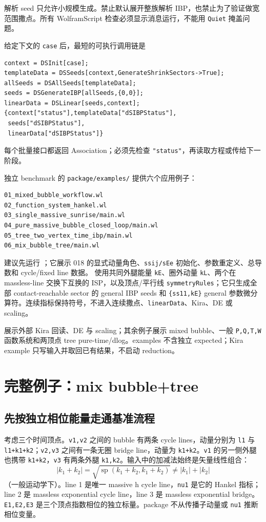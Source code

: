 ﻿\documentclass[a4paper,11pt]{article}
\begin{document}
\begin{proofbox}
解析 seed 只允许小规模生成。禁止默认展开整族解析 IBP，也禁止为了验证做宽范围撒点。所有 WolframScript 检查必须显示消息运行，不能用 \texttt{Quiet} 掩盖问题。
\end{proofbox}

给定下文的 \texttt{case} 后，最短的可执行调用链是
\begin{verbatim}
context = DSInit[case];
templateData = DSSeeds[context,GenerateShrinkSectors->True];
allSeeds = DSAllSeeds[templateData];
seeds = DSGenerateIBP[allSeeds,{0,0}];
linearData = DSLinear[seeds,context];
{context["status"],templateData["dSIBPStatus"],
 seeds["dSIBPStatus"],
 linearData["dSIBPStatus"]}
\end{verbatim}
每个批量接口都返回 Association；必须先检查 \texttt{"status"}，再读取方程或传给下一阶段。

独立 benchmark 的 \texttt{package/examples/} 提供六个应用例子：
\begin{verbatim}
01_mixed_bubble_workflow.wl
02_function_system_hankel.wl
03_single_massive_sunrise/main.wl
04_pure_massive_bubble_closed_loop/main.wl
05_tree_two_vertex_time_ibp/main.wl
06_mix_bubble_tree/main.wl
\end{verbatim}
建议先运行 ；它展示 018 的显式动量角色、\texttt{ssij/sEe} 初始化、参数重定义、总导数和 cycle/fixed line 数据。 使用共同外腿能量 \texttt{kE}、圈外动量 \texttt{kL}、两个在 massless-line 交换下互换的 ISP，以及顶点/平行线 \texttt{symmetryRules}；它只生成全部 contact-reachable sector 的 general IBP seeds 和 \texttt{\{ss11,kE\}} general 参数微分算符。连续指标保持符号，不进入连续撒点、\texttt{linearData}、Kira、DE 或 scaling。

 展示外部 Kira 回读、DE 与 scaling；其余例子展示 mixed bubble、一般 \texttt{P,Q,T,W} 函数系统和两顶点 tree pure-time/dlog。examples 不含独立 expected；Kira example 只写输入并取回已有结果，不启动 reduction。

\section{完整例子：mix bubble+tree}

\subsection{先按独立相位能量走通基准流程}

考虑三个时间顶点。\texttt{v1,v2} 之间的 bubble 有两条 cycle lines，动量分别为
\texttt{l1} 与 \texttt{l1+k1+k2}；\texttt{v2,v3} 之间有一条无圈 bridge line，动量为
\texttt{k1+k2}。\texttt{v1} 的另一侧外腿也携带 \texttt{k1+k2}，\texttt{v3} 有两条外腿
\texttt{k1,k2}。输入中的加减法始终是矢量线性组合：
\begin{equation}
 |k_1+k_2|=\sqrt{\operatorname{sp}(k_1+k_2,k_1+k_2)}
 \neq |k_1|+|k_2|
\end{equation}
（一般运动学下）。line 1 是唯一 massive h cycle line，\texttt{nu1} 是它的 Hankel 指标；
line 2 是 massless exponential cycle line，line 3 是 massless exponential bridge。
\texttt{E1,E2,E3} 是三个顶点指数相位的独立标量。package 不从传播子动量或 \texttt{nu1} 推断相位变量。
\end{document}
